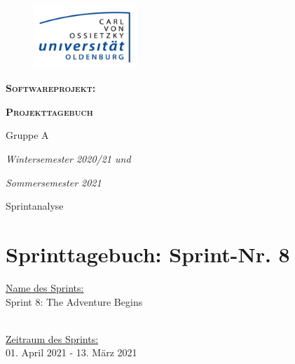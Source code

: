 \documentclass[12pt,a4paper, oneside]{article}
\author{Uni Oldenburg, SWP2020 Gruppe A}
\begin{document}
\begin{titlepage}
\pagestyle{empty}
\begin{center}

\begin{figure}[h]									
\centering											
\includegraphics[width=0.35\textwidth]{../img/Logo.jpg}
\end{figure}		

\bigskip \bigskip \noindent							
\textsc{\textbf{\LARGE Softwareprojekt:}} \par \bigskip \noindent																			
\textsc{\textbf{\LARGE Projekttagebuch}} 			    
													
\par \bigskip \bigskip \bigskip \bigskip \bigskip \noindent
{\Large Gruppe A} \par \medskip \noindent
		
\par \bigskip \bigskip \bigskip \bigskip \bigskip \bigskip \noindent																		
\textit{\Large Wintersemester 2020/21 und} \par \noindent
\textit{\Large Sommersemester 2021}				
													
\par \bigskip \bigskip \bigskip \bigskip \bigskip \bigskip \noindent			
\par \bigskip \bigskip \bigskip \noindent
{\Large Sprintanalyse} \par \medskip \noindent
		
\end{center}
\end{titlepage}

\tableofcontents
\pagebreak

\section{Sprinttagebuch: Sprint-Nr. 8}
\underline{Name des Sprints:}
\\
Sprint 8: The Adventure Begins

\noindent
\\
\underline{Zeitraum des Sprints:} 
\\
01. April 2021 - 13. März 2021
\end{document}
